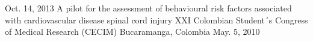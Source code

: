 \begin{cventries}
    {Oct. 14, 2013} %
    {
    }
  \cventry
    {A pilot for the assessment of behavioural risk factors associated with cardiovascular disease spinal cord injury} %
    {XXI Colombian Student´s Congress of Medical Research (CECIM)} %
    {Bucaramanga, Colombia} %
    {May. 5, 2010} %
    {
    }
\end{cventries}


\begin{refsection}
  \nocite{can2015}
  \nocite{candevbio2016}
  \nocite{uva2016}
  \nocite{sfn2016}
  \nocite{bcregmed2017}
  \nocite{bcregmed2018}
  \nocite{can2018}
  \nocite{sfn2018}
  \nocite{can2019}
	\nocite{igcj2019}
	
		\printbibliography[
		heading=none, 
		sorting=ydnt
		]
\end{refsection}